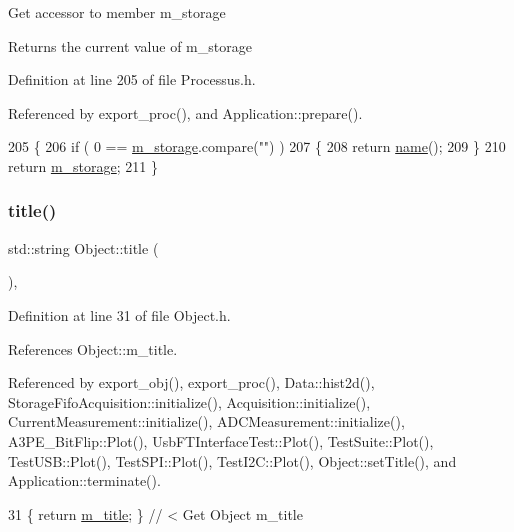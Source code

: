 Get accessor to member m\+\_\+storage \begin{DoxyReturn}{Returns}
the current value of m\+\_\+storage 
\end{DoxyReturn}


Definition at line 205 of file Processus.\+h.



Referenced by export\+\_\+proc(), and Application\+::prepare().


\begin{DoxyCode}
205                        \{
206     \textcolor{keywordflow}{if} ( 0 == \hyperlink{classProcessus_a132b1e71f72327e5a87f0a168c7b6325}{m\_storage}.compare(\textcolor{stringliteral}{""}) )
207     \{
208       \textcolor{keywordflow}{return} \hyperlink{classObject_a300f4c05dd468c7bb8b3c968868443c1}{name}();
209     \}
210     \textcolor{keywordflow}{return} \hyperlink{classProcessus_a132b1e71f72327e5a87f0a168c7b6325}{m\_storage};
211   \}
\end{DoxyCode}
\mbox{\label{classObject_a73a0f1a41828fdd8303dd662446fb6c3}} 
\subsubsection{\texorpdfstring{title()}{title()}}
{\footnotesize\ttfamily std\+::string Object\+::title (\begin{DoxyParamCaption}{ }\end{DoxyParamCaption})\hspace{0.3cm}{\ttfamily [inline]}, {\ttfamily [inherited]}}



Definition at line 31 of file Object.\+h.



References Object\+::m\+\_\+title.



Referenced by export\+\_\+obj(), export\+\_\+proc(), Data\+::hist2d(), Storage\+Fifo\+Acquisition\+::initialize(), Acquisition\+::initialize(), Current\+Measurement\+::initialize(), A\+D\+C\+Measurement\+::initialize(), A3\+P\+E\+\_\+\+Bit\+Flip\+::\+Plot(), Usb\+F\+T\+Interface\+Test\+::\+Plot(), Test\+Suite\+::\+Plot(), Test\+U\+S\+B\+::\+Plot(), Test\+S\+P\+I\+::\+Plot(), Test\+I2\+C\+::\+Plot(), Object\+::set\+Title(), and Application\+::terminate().


\begin{DoxyCode}
31 \{ \textcolor{keywordflow}{return} \hyperlink{classObject_affbeea1953eb5163573b92fad8f75727}{m\_title};      \} \textcolor{comment}{// < Get Object m\_title}
\end{DoxyCode}
\mbox{\label{classObject_a84f99f70f144a83e1582d1d0f84e4e62}} 

